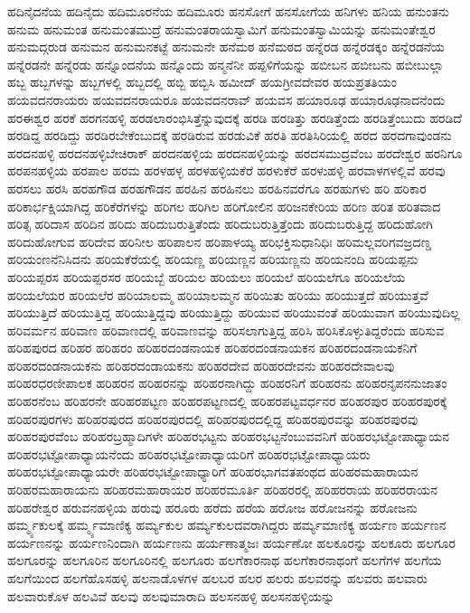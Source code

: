 {ಹದಿನೈದನೆಯ
ಹದಿನೈದು
ಹದಿಮೂರನೆಯ
ಹದಿಮೂರು
ಹನಸೋಗೆ
ಹನಸೋಗೆಯ
ಹನಿಗಳು
ಹನಿಯ
ಹನುಂತನು
ಹನುಮ
ಹನುಮಂತ
ಹನುಮಂತಮುದ್ರೆ
ಹನುಮಂತರಾಯಸ್ವಾಮಿಗೆ
ಹನುಮಂತಸ್ವಾಮಿಯನ್ನು
ಹನುಮಂತೇಶ್ವರ
ಹನುಮದ್ಗರುಡ
ಹನುಮನ
ಹನುಮನಕಟ್ಟೆ
ಹನುಮನೇ
ಹನೆಮಠ
ಹನೆಮಠದ
ಹನ್ನೆರಡ
ಹನ್ನೆರಡಕ್ಕಂ
ಹನ್ನೆರಡನೆಯ
ಹನ್ನೆರಡನೇ
ಹನ್ನೆರಡು
ಹನ್ನೊಂದನೆಯ
ಹನ್ನೊಂದು
ಹನ್ಮನೆನೀ
ಹಪ್ಪಳಿಗೆಯನ್ನು
ಹಬೀಬನ
ಹಬೀಬನು
ಹಬೀಬುಲ್ಲಾ
ಹಬ್ಬ
ಹಬ್ಬಗಳನ್ನು
ಹಬ್ಬಗಳಲ್ಲಿ
ಹಬ್ಬದಲ್ಲಿ
ಹಬ್ಬಿ
ಹಬ್ಬಿಸಿ
ಹಮೀದ್
ಹಯಗ್ರೀವದೇವರ
ಹಯಪ್ರತತಿಯಂ
ಹಯವದನರಾಯರು
ಹಯವದನರಾಯರೂ
ಹಯವದನರಾವ್
ಹಯವಸ
ಹಯಾರೂಢ
ಹಯಾರೂಢನಾದನೆಂದು
ಹರಈಶ್ವರ
ಹರಕೆ
ಹರಗನಹಳ್ಳಿ
ಹರಡಲಾರಂಭಿಸಿತ್ತೆನ್ನುವುದಕ್ಕೆ
ಹರಡಿ
ಹರಡಿತ್ತು
ಹರಡಿತ್ತೆಂದು
ಹರಡಿತ್ತೆಂಬುದು
ಹರಡಿದೆ
ಹರಡಿದ್ದ
ಹರಡಿದ್ದು
ಹರಡಿರಬೇಕೆಂಬುದಕ್ಕೆ
ಹರಡಿರುವ
ಹರಡುವಿಕೆ
ಹರತಿ
ಹರತಿಸಿರಿಯಲ್ಲಿ
ಹರದ
ಹರದಗಾವುಂಡನು
ಹರದನಹಳ್ಳಿ
ಹರದನಹಳ್ಳಿಬೇಚಿರಾಕ್
ಹರದನಹಳ್ಳಿಯ
ಹರದನಹಳ್ಳಿಯನ್ನು
ಹರದಸಮುದ್ರವೆಂಬ
ಹರದೇಶ್ವರ
ಹರನಿಗೂ
ಹರಪನಹಳ್ಳಿಯ
ಹರಪಾಲ
ಹರಮ
ಹರಳಹಳ್ಳ
ಹರಳಹಳ್ಳಿಯಕೆರೆ
ಹರಳುಕೆರೆ
ಹರಳುಹಳ್ಳಿ
ಹರವಾಳಗಳಲ್ಲಿವೆ
ಹರವು
ಹರಸಲು
ಹರಸಿ
ಹರಹಗೌಡ
ಹರಹಗೌಡನ
ಹರಹಿನ
ಹರಹಿನಲು
ಹರಹಿನವರೆಗೂ
ಹರಹುಗಳು
ಹರಿ
ಹರಿಕಾರ
ಹರಿಕಾರ್ಭಕ್ಷಿಯಾಗಿದ್ದ
ಹರಿಕೆರೆಗಳನ್ನು
ಹರಿಗಲ
ಹರಿಗಿಲ
ಹರಿಗೋಲಿನ
ಹರಿಜನಕೇರಿಯ
ಹರಿಣ
ಹರಿತ
ಹರಿತವಾದ
ಹರಿತ್ಸ
ಹರಿದಾಸ
ಹರಿದಿನ
ಹರಿದು
ಹರಿದುಬರುತ್ತಿತೆಂದು
ಹರಿದುಬರುತ್ತಿತ್ತೆಂದು
ಹರಿದುಬರುತ್ತಿದ್ದ
ಹರಿದುಹೋಗಿ
ಹರಿದುಹೋಗುವ
ಹರಿದೇವ
ಹರಿನೀಲ
ಹರಿಪಾಲನ
ಹರಿಪಾಳಯ್ಯ
ಹರಿಭಕ್ತಿಸುಧಾನಿಧಿಃ
ಹರಿಮಲ್ಲವರಿಗವಜ್ರದಣ್ಡ
ಹರಿಯಂಣನೆನಿಸಿದನು
ಹರಿಯಕೆರೆಯಲ್ಲಿ
ಹರಿಯಣ್ಣ
ಹರಿಯಣ್ಣನ
ಹರಿಯಣ್ಣನು
ಹರಿಯನಂದಿ
ಹರಿಯಪ್ಪನು
ಹರಿಯಪ್ಪರಸ
ಹರಿಯಪ್ಪರಸರ
ಹರಿಯಬ್ಬೆ
ಹರಿಯಲ
ಹರಿಯಲು
ಹರಿಯಲೆ
ಹರಿಯಲೆಗೂ
ಹರಿಯಲೆಯ
ಹರಿಯಲೆಯರ
ಹರಿಯಲೆರ
ಹರಿಯಾಲಮ್ಮ
ಹರಿಯಾಲಮ್ಮನ
ಹರಿಯಿತು
ಹರಿಯು
ಹರಿಯುತ್ತದೆ
ಹರಿಯುತ್ತವೆ
ಹರಿಯುತ್ತಿದೆ
ಹರಿಯುತ್ತಿದ್ದ
ಹರಿಯುತ್ತಿದ್ದವು
ಹರಿಯುತ್ತಿದ್ದು
ಹರಿಯುವ
ಹರಿಯುವಂತೆ
ಹರಿಯುವಾಗ
ಹರಿಯುವುದಿಲ್ಲ
ಹರಿವರ್ಮನ
ಹರಿವಾಣ
ಹರಿವಾಣದಲ್ಲಿ
ಹರಿವಾಣವನ್ನು
ಹರಿಸಲಾಗುತ್ತಿದ್ದ
ಹರಿಸಿ
ಹರಿಸಿಕೊಳ್ಳುತಿದ್ದರೆಂದು
ಹರಿಸುವ
ಹರಿಹಪುರದ
ಹರಿಹರ
ಹರಿಹರಂ
ಹರಿಹರದಂಡನಾಯಕ
ಹರಿಹರದಂಡನಾಯಕನ
ಹರಿಹರದಂಡನಾಯಕನಿಗೆ
ಹರಿಹರದಂಡನಾಯಕನು
ಹರಿಹರದಂಡಾಯಕನು
ಹರಿಹರದೇವ
ಹರಿಹರದೇವನು
ಹರಿಹರದೇವಾಲವು
ಹರಿಹರಧರಣೀಪಾಲಕ
ಹರಿಹರನ
ಹರಿಹರನನ್ನು
ಹರಿಹರನಾಗಿದ್ದು
ಹರಿಹರನಿಗೆ
ಹರಿಹರನು
ಹರಿಹರನೃಪನನುಜಾತಂ
ಹರಿಹರನೆಂಬ
ಹರಿಹರನೇ
ಹರಿಹರಪಟ್ಟಣ
ಹರಿಹರಪಟ್ಟಣದಲ್ಲಿ
ಹರಿಹರಪಟ್ಟವರ್ಧನರ
ಹರಿಹರಪುರ
ಹರಿಹರಪುರಕ್ಕೆ
ಹರಿಹರಪುರಗಳು
ಹರಿಹರಪುರದ
ಹರಿಹರಪುರದಲ್ಲಿ
ಹರಿಹರಪುರದಲ್ಲಿದ್ದ
ಹರಿಹರಪುರವನ್ನು
ಹರಿಹರಪುರವು
ಹರಿಹರಪುರವೆಂಬ
ಹರಿಹರಬ್ರಹ್ಮಾದಿಗಳೇ
ಹರಿಹರಭಟ್ಟನು
ಹರಿಹರಭಟ್ಟನೆಂಬುವವನಿಗೆ
ಹರಿಹರಭಟ್ಟೋಪಾಧ್ಯಾಯನ
ಹರಿಹರಭಟ್ಟೋಪಾಧ್ಯಾಯನೆಂದು
ಹರಿಹರಭಟ್ಟೋಪಾಧ್ಯಾಯರಿಗೆ
ಹರಿಹರಭಟ್ಟೋಪಾಧ್ಯಾಯರು
ಹರಿಹರಭಟ್ಟೋಪಾಧ್ಯಾಯರೇ
ಹರಿಹರಭಟ್ಟೋಪಾಧ್ಯಾರಿಗೆ
ಹರಿಹರಭಾಗವತಪಂಥದ
ಹರಿಹರಮಹಾರಾಯನ
ಹರಿಹರಮಹಾರಾಯನು
ಹರಿಹರಮಹಾರಾಯರ
ಹರಿಹರಮೂರ್ತಿ
ಹರಿಹರರಲ್ಲಿ
ಹರಿಹರರಾಯ
ಹರಿಹರರಾಯನ
ಹರಿಹರೇಶ್ವರ
ಹರುವನಹಳ್ಳಿಯ
ಹರುವು
ಹರೂರು
ಹರೆದು
ಹರೆಯ
ಹರೋಜ
ಹರೋಜನನ್ನು
ಹರೋಜನು
ಹರ್ಮ್ಮ್ಯಕುಲಕ್ಕೆ
ಹರ್ಮ್ಮ್ಯಮಾಣಿಕ್ಯ
ಹರ್ಮ್ಯಕುಲ
ಹರ್ಮ್ಯಕುಲದವರಾಗಿದ್ದರು
ಹರ್ಮ್ಯಮಾಣಿಕ್ಯ
ಹರ್ಯಣ
ಹರ್ಯಣನ
ಹರ್ಯಣನನ್ನು
ಹರ್ಯಣನಿಂದಾಗಿ
ಹರ್ಯಣನು
ಹರ್ಯಣಾತ್ಮಜಃ
ಹರ್ಯಣೋ
ಹಲಕೂರನ್ನು
ಹಲಕೂರು
ಹಲಗೂರ
ಹಲಗೂರನ್ನು
ಹಲಗೂರಿನ
ಹಲಗೂರಿನಲ್ಲಿ
ಹಲಗೂರು
ಹಲಗೆಕಾರನಾಥ
ಹಲಗೆಕಾರನಾಥಂಗೆ
ಹಲಗೆಗಳ
ಹಲಗೆಯ
ಹಲಗೆಯಿಂದ
ಹಲಗೆಹೊಸಹಳ್ಳಿ
ಹಲನಾಡೊಳಗಳ
ಹಲಬರ
ಹಲರ
ಹಲರು
ಹಲವರನ್ನು
ಹಲವರು
ಹಲವಾರು
ಹಲವಾರುಕೊಳ
ಹಲವಿವೆ
ಹಲವು
ಹಲವುಮಾರಾದಿ
ಹಲಸನಹಳ್ಳಿ
ಹಲಸನಹಳ್ಳಿಯನ್ನು
}
